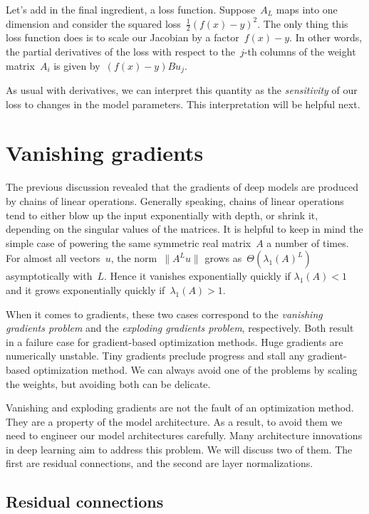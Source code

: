 \documentclass{tufte-book}
\begin{document}
Let's add in the final ingredient, a loss function. Suppose~\(A_L\) maps
into one dimension and consider the squared loss~\(\frac12(f(x)-y)^2.\)
The only thing this loss function does is to scale our Jacobian by a
factor~\(f(x)-y.\) In other words, the partial derivatives of the loss
with respect to the~\(j\)-th columns of the weight matrix~\(A_i\) is
given by~\((f(x)-y)Bu_j\).

As usual with derivatives, we can interpret this quantity as the
\emph{sensitivity} of our loss to changes in the model parameters. This
interpretation will be helpful next.

\hypertarget{vanishing-gradients}{%
\section{Vanishing gradients}\label{vanishing-gradients}}

The previous discussion revealed that the gradients of deep models are
produced by chains of linear operations. Generally speaking, chains of
linear operations tend to either blow up the input exponentially with
depth, or shrink it, depending on the singular values of the matrices.
It is helpful to keep in mind the simple case of powering the same
symmetric real matrix~\(A\) a number of times. For almost all
vectors~\(u\), the norm~\(\|A^Lu\|\) grows
as~\(\Theta\left(\lambda_1(A)^L\right)\) asymptotically with~\(L\).
Hence it vanishes exponentially quickly if \(\lambda_1(A)<1\) and it
grows exponentially quickly if~\(\lambda_1(A)>1.\)

When it comes to gradients, these two cases correspond to the
\emph{vanishing gradients problem} and the \emph{exploding gradients
problem}, respectively. Both result in a failure case for gradient-based
optimization methods. Huge gradients are numerically unstable. Tiny
gradients preclude progress and stall any gradient-based optimization
method. We can always avoid one of the problems by scaling the weights,
but avoiding both can be delicate.

Vanishing and exploding gradients are not the fault of an optimization
method. They are a property of the model architecture. As a result, to
avoid them we need to engineer our model architectures carefully. Many
architecture innovations in deep learning aim to address this problem.
We will discuss two of them. The first are residual connections, and the
second are layer normalizations.

\hypertarget{residual-connections}{%
\subsection{Residual connections}\label{residual-connections}}
\end{document}

